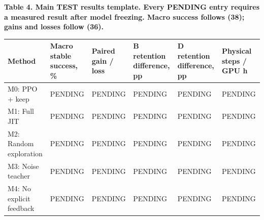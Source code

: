 \documentclass[
  american,
  11pt,
  a4paper,
]{article}
\newcounter{none} %
\begin{document}
\par\medskip
\noindent\begin{minipage}{\linewidth}
\textbf{Table 4. Main TEST results template. Every PENDING entry
requires a measured result after model freezing. Macro success follows
(38); gains and losses follow (36).}

{\def\LTcaptype{none} %
\begin{tabular}{@{}
  >{\raggedright\arraybackslash}p{}
  >{\centering\arraybackslash}p{}
  >{\centering\arraybackslash}p{}
  >{\centering\arraybackslash}p{}
  >{\centering\arraybackslash}p{}
  >{\centering\arraybackslash}p{}@{}}
\toprule\noalign{}
\begin{minipage}[b]{\linewidth}\raggedright
Method
\end{minipage} & \begin{minipage}[b]{\linewidth}\centering
Macro stable success, \%
\end{minipage} & \begin{minipage}[b]{\linewidth}\centering
Paired gain / loss
\end{minipage} & \begin{minipage}[b]{\linewidth}\centering
B retention difference, pp
\end{minipage} & \begin{minipage}[b]{\linewidth}\centering
D retention difference, pp
\end{minipage} & \begin{minipage}[b]{\linewidth}\centering
Physical steps / GPU h
\end{minipage} \\
\midrule\noalign{}
M0: PPO + keep & PENDING & PENDING & PENDING & PENDING & PENDING \\
M1: Full JIT & PENDING & PENDING & PENDING & PENDING & PENDING \\
M2: Random exploration & PENDING & PENDING & PENDING & PENDING &
PENDING \\
M3: Noise teacher & PENDING & PENDING & PENDING & PENDING & PENDING \\
M4: No explicit feedback & PENDING & PENDING & PENDING & PENDING &
PENDING \\
\bottomrule
\end{tabular}
}
\end{minipage}
\par\medskip
\end{document}
